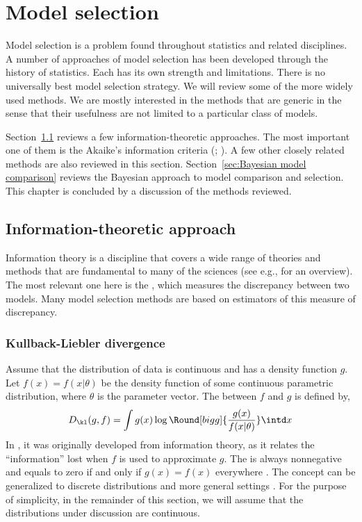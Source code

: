 \chapter{Model selection}
\label{cha:Model selection}

Model selection is a problem found throughout statistics and related
disciplines. A number of approaches of model selection has been developed
through the history of statistics. Each has its own strength and limitations.
There is no universally best model selection strategy. We will review some of
the more widely used methods. We are mostly interested in the methods that are
generic in the sense that their usefulness are not limited to a particular
class of models.

Section~\ref{sec:Information theoretic approach} reviews a few
information-theoretic approaches. The most important one of them is the
Akaike's information criteria (\aic; \cite{Akaike:1973uc,Akaike:1974ih}). A
few other closely related methods are also reviewed in this section.
Section~\ref{sec:Bayesian model comparison} reviews the Bayesian approach to
model comparison and selection. This chapter is concluded by a discussion of
the methods reviewed.

\section{Information-theoretic approach}
\label{sec:Information theoretic approach}

Information theory is a discipline that covers a wide range of theories and
methods that are fundamental to many of the sciences (see e.g.,
\cite{Cover:1991vx} for an overview). The most relevant one here is the \kld
\cite{Kullback:1951va}, which measures the discrepancy between two models.
Many model selection methods are based on estimators of this measure of
discrepancy.

\subsection{Kullback-Liebler divergence}
\label{sub:Kullback-Liebler divergence}

Assume that the distribution of data is continuous and has a density function
$g$. Let $f(x) = f(x|\theta)$ be the density function of some continuous
parametric distribution, where $\theta$ is the parameter vector. The \kld
between $f$ and $g$ is defined by,
\begin{equation}
  D_{\kl}(g,f) = \int g(x)\log\Round[bigg]{\frac{g(x)}{f(x|\theta)}}\intd x
  \label{eq:kl}
\end{equation}
In \cite{Kullback:1951va}, it was originally developed from information
theory, as it relates the ``information'' lost when $f$ is used to
approximate $g$. The \kld is always nonnegative and equals to zero if and
only if $g(x) = f(x)$ everywhere \cite[][sec.~6.8]{Burnham:2002wc}. The
concept can be generalized to discrete distributions and more general
settings \cite[][sec.~2.1.3]{Burnham:2002wc}. For the purpose of simplicity,
in the remainder of this section, we will assume that the distributions under
discussion are continuous.

